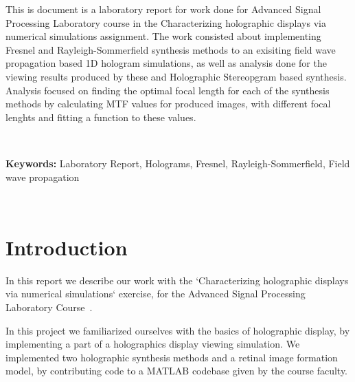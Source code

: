 \documentclass[12pt,a4paper,english
]{tunithesis}
\begin{document}
\vspace{0.5cm}


\noindent
This is document is a laboratory report for work done for Advanced Signal Processing Laboratory course in the Characterizing holographic displays via numerical simulations assignment. The work consisted about implementing Fresnel and Rayleigh-Sommerfield synthesis methods to an exisiting field wave propagation based 1D hologram simulations, as well as analysis done for the viewing results produced by these and Holographic Stereopgram based synthesis. Analysis focused on finding the optimal focal length for each of the synthesis methods by calculating MTF values for produced images, with different focal lenghts and fitting a function to these values.

~

\noindent\textbf{Keywords:} Laboratory Report, Holograms, Fresnel, Rayleigh-Sommerfield, Field wave propagation

~




\setcounter{tocdepth}{3}              %
\tableofcontents                      %


\if@twoside
\cleardoublepage
\fi


\renewcommand{\chaptername}{} %


\chapter{Introduction}
\label{ch:intro}
\setcounter{page}{1} 
In this report we describe our work with the `Characterizing holographic displays via
numerical simulations` exercise, for the Advanced Signal Processing Laboratory Course~\cite{labassignment}.

In this project we familiarized ourselves with the basics of holographic display, by implementing a part of a holographics display viewing simulation. We implemented two holographic synthesis methods and a retinal image formation model, by contributing code to a MATLAB codebase given by the course faculty.
\end{document}
